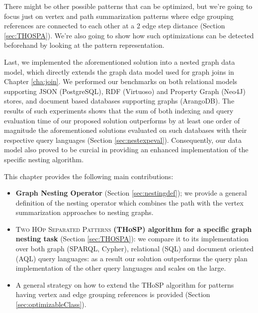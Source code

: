 There might be other possible patterns that can be optimized, but we're going to focus just on vertex and path summarization patterns where edge grouping references are connected to each other at a 2 edge step distance (Section \ref{sec:THOSPA}). We're also going to show how such optimizations can be detected beforehand by looking at the pattern representation.


Last, we implemented the aforementioned solution into a nested graph data model, which directly extends the graph data model used for graph joins in Chapter \vref{cha:join}. We performed our benchmarks on both relational models supporting JSON (PostgreSQL), RDF (Virtuoso) and Property Graph (Neo4J) stores, and document based databases supporting graphs (ArangoDB). The results of such experiments shows that the sum of both indexing and query evaluation time of our proposed solution outperforms by at least one order of magnitude the aforementioned solutions evaluated on such databases with their respective query languages (Section \ref{sec:nestexpeval}). Consequently, our data model also proved to be curcial in providing an enhanced implementation of the specific nesting algorithm. 

This chapter provides the following main contributions:

\begin{itemize}
	\item \textbf{Graph Nesting Operator} (Section \ref{sec:nestingdef}); we provide a general definition of the nesting operator which combines the path  with the vertex summarization approaches to nesting graphs.
	\item \textsc{{Two HOp Separated Patterns}} \textbf{(THoSP) algorithm for a specific graph nesting task} (Section \ref{sec:THOSPA}): we
	compare it to its implementation
	over both graph  (SPARQL, Cypher), relational (SQL) and document oriented (AQL) query languages: as a result our solution outperforms
	the query plan implementation of the other query languages and scales on the large.
	\item A general strategy on how to extend the THoSP algorithm for patterns having vertex and edge grouping references is provided (Section \ref{sec:optimizableClass}).
\end{itemize}


